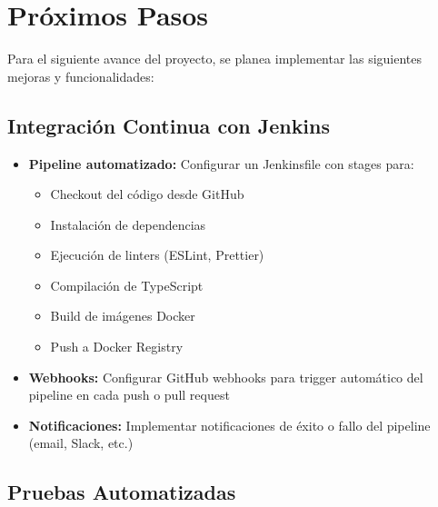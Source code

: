 \documentclass[12pt,a4paper]{article}
\begin{document}
\section{Próximos Pasos}

Para el siguiente avance del proyecto, se planea implementar las siguientes mejoras y funcionalidades:

\subsection{Integración Continua con Jenkins}

\begin{itemize}
    \item \textbf{Pipeline automatizado:} Configurar un Jenkinsfile con stages para:
    \begin{itemize}
        \item Checkout del código desde GitHub
        \item Instalación de dependencias
        \item Ejecución de linters (ESLint, Prettier)
        \item Compilación de TypeScript
        \item Build de imágenes Docker
        \item Push a Docker Registry
    \end{itemize}
    
    \item \textbf{Webhooks:} Configurar GitHub webhooks para trigger automático del pipeline en cada push o pull request
    
    \item \textbf{Notificaciones:} Implementar notificaciones de éxito o fallo del pipeline (email, Slack, etc.)
\end{itemize}

\subsection{Pruebas Automatizadas}
\end{document}
